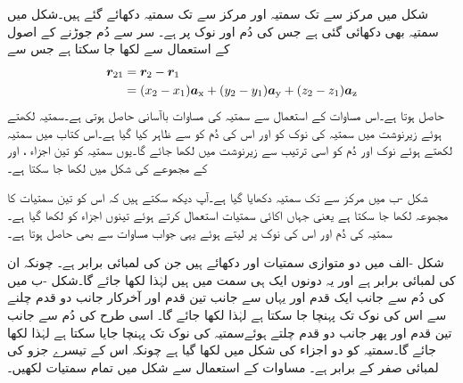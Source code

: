 شکل  میں  مرکز سے  تک سمتیہ  اور  مرکز سے  تک سمتیہ  دکھائے گئے ہیں۔شکل میں سمتیہ  بھی دکھائی گئی ہے جس کی دُم   اور  نوک  پر ہے۔ سر سے دُم جوڑنے کے اصول کے استعمال سے  لکھا جا سکتا ہے جس سے 
\begin{gather}
\begin{aligned}\label{مساوات_سمتیہ_کارتیسی_نظام_میں_قیمت}
{\ensuremath{{\boldsymbol{r}}}}_{21}&={{\boldsymbol{r}}}_2-{{\boldsymbol{r}}}_1\\
&=(x_2-x_1) {\boldsymbol{a}}_{\textup{x}}+(y_2-y_1){\boldsymbol{a}}_{\textup{y}}+(z_2-z_1){\boldsymbol{a}}_{\textup{z}}
\end{aligned}
\end{gather}
حاصل ہوتا ہے۔اس مساوات کے استعمال سے سمتیہ کی مساوات باآسانی حاصل ہوتی ہے۔سمتیہ  لکھتے ہوئے زیرنوشت میں سمتیہ کی نوک کو  اور اس کی دُم  کو  سے ظاہر کیا گیا ہے۔اس کتاب میں سمتیہ لکھتے ہوئے نوک اور دُم  کو اسی ترتیب سے زیرنوشت میں لکھا جائے گا۔یوں سمتیہ  کو تین اجزاء ،  اور  کے  مجموعے کی شکل میں لکھا جا سکتا ہے۔

شکل -ب میں مرکز سے  تک سمتیہ دکھایا گیا ہے۔آپ دیکھ سکتے ہیں کہ اس کو تین سمتیات کا مجموعہ لکھا جا سکتا ہے یعنی  جہاں اکائی سمتیات استعمال کرتے ہوئے تینوں اجزاء کو لکھا گیا ہے۔ سمتیہ کی دُم  اور اس کی نوک  پر لیتے ہوئے  یہی جواب  مساوات  سے بھی حاصل ہوتا ہے۔

شکل -الف میں دو متوازی سمتیات  اور  دکھائے ہیں جن کی لمبائی برابر ہے۔ چونکہ ان کی لمبائی برابر ہے اور یہ دونوں ایک ہی سمت میں ہیں لہٰذا  لکھا جائے گا۔شکل -ب میں  کی دُم سے  جانب ایک قدم اور یہاں سے  جانب تین قدم اور آخرکار  جانب دو قدم چلنے سے اس کی نوک تک پہنچا جا سکتا ہے لہٰذا  لکھا جائے گا۔ اسی طرح  کی دُم سے   جانب تین قدم اور پھر  جانب دو قدم چلتے ہوئےسمتیہ کی نوک تک پہنچا جایا سکتا ہے لہٰذا  لکھا جائے گا۔سمتیہ  کو دو اجزاء کی شکل میں لکھا گیا ہے چونکہ اس کے تیسرے جزو کی لمبائی صفر کے برابر ہے۔
مساوات  کے استعمال سے شکل  میں تمام سمتیات لکھیں۔

